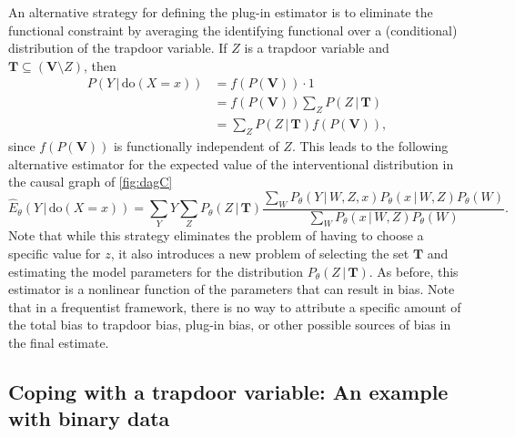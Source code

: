 \documentclass{statsoc}
\newcommand{\+}[1]{\ensuremath{\mathbf{#1}}}
\newcommand{\doo}{\textrm{do}}
\newcommand{\given}{{ \, | \, }}
\begin{document}
An alternative strategy for defining the plug-in estimator is to eliminate the functional constraint by averaging the identifying functional over a (conditional) distribution of the trapdoor variable. If $Z$ is a trapdoor variable and $\+ T \subseteq (\+ V \setminus Z)$, then
\begin{align*}
  P(Y \given \doo(X = x)) &= f(P(\+ V)) \cdot 1 \\
                          &= f(P(\+ V)) \sum_{Z} P(Z \given \+ T) \\
                          &= \sum_{Z} P(Z \given \+ T) f(P(\+ V)),
\end{align*}
since $f(P(\+ V))$ is functionally independent of $Z$. This leads to the following alternative estimator for the expected value of the interventional distribution in the causal graph of \autoref{fig:dagC}
\begin{equation} \label{eq:plugin2}
\widehat E_{\theta}(Y \given \doo(X = x)) = \sum_{Y}Y\sum_{Z} P_\theta(Z \given \+ T) \frac{\sum_{W}P_\theta(Y \given W, Z, x)P_\theta(x \given  W, Z) P_\theta(W)}{\sum_{W}P_{\theta}(x \given  W, Z) P_\theta(W)}.
\end{equation}
Note that while this strategy eliminates the problem of having to choose a specific value for $z$, it also introduces a new problem of selecting the set $\+ T$ and estimating the model parameters for the distribution $P_{\theta}(Z \given \+ T)$. As before, this estimator is a nonlinear function of the parameters that can result in bias. Note that in a frequentist framework, there is no way to attribute a specific amount of the total bias to trapdoor bias, plug-in bias, or other possible sources of bias in the final estimate.

\subsection{Coping with a trapdoor variable: An example with binary data}
\label{sec:bernoulli-model}
\end{document}
